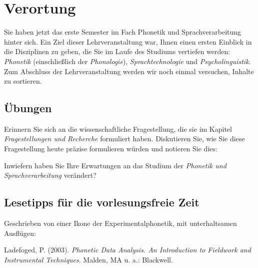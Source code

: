\documentclass[11pt]{book}
\begin{document}
\chapter{Verortung}

Sie haben jetzt das erste Semester im Fach Phonetik und Sprachverarbeitung hinter sich. Ein Ziel dieser Lehrveranstaltung war, Ihnen einen ersten Einblick in die Disziplinen zu geben, die Sie im Laufe des Studiums vertiefen werden: \emph{Phonetik} (einschließlich der \emph{Phonologie}), \emph{Sprachtechnologie} und \emph{Psycholinguistik}. Zum Abschluss der Lehrveranstaltung werden wir noch einmal versuchen, Inhalte zu sortieren.


\newpage

\section{Übungen}


Erinnern Sie sich an die wissenschaftliche Fragestellung, die sie im Kapitel \emph{Fragestellungen und Recherche} formuliert haben. Diskutieren Sie, wie Sie diese Fragestellung heute präzise formulieren würden und notieren Sie dies:

\vspace{5cm}

Inwiefern haben Sie Ihre Erwartungen an das Studium der \emph{Phonetik und Sprachverarbeitung} verändert?

\vspace{5cm}


\section{Lesetipps für die vorlesungsfreie Zeit}

Geschrieben von einer Ikone der Experimentalphonetik, mit unterhaltsamen Ausflügen:

Ladefoged, P. (2003). \emph{Phonetic Data Analysis. An Introduction to Fieldwork and Instrumental Techniques}. Malden, MA u. a.: Blackwell.
\end{document}
